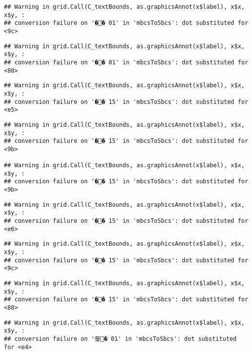 \documentclass[]{article}
\begin{document}
\begin{verbatim}
## Warning in grid.Call(C_textBounds, as.graphicsAnnot(x$label), x$x, x$y, :
## conversion failure on '�� 01' in 'mbcsToSbcs': dot substituted for <9c>
\end{verbatim}

\begin{verbatim}
## Warning in grid.Call(C_textBounds, as.graphicsAnnot(x$label), x$x, x$y, :
## conversion failure on '�� 01' in 'mbcsToSbcs': dot substituted for <88>
\end{verbatim}

\begin{verbatim}
## Warning in grid.Call(C_textBounds, as.graphicsAnnot(x$label), x$x, x$y, :
## conversion failure on '�� 15' in 'mbcsToSbcs': dot substituted for <e5>
\end{verbatim}

\begin{verbatim}
## Warning in grid.Call(C_textBounds, as.graphicsAnnot(x$label), x$x, x$y, :
## conversion failure on '�� 15' in 'mbcsToSbcs': dot substituted for <9b>

## Warning in grid.Call(C_textBounds, as.graphicsAnnot(x$label), x$x, x$y, :
## conversion failure on '�� 15' in 'mbcsToSbcs': dot substituted for <9b>
\end{verbatim}

\begin{verbatim}
## Warning in grid.Call(C_textBounds, as.graphicsAnnot(x$label), x$x, x$y, :
## conversion failure on '�� 15' in 'mbcsToSbcs': dot substituted for <e6>
\end{verbatim}

\begin{verbatim}
## Warning in grid.Call(C_textBounds, as.graphicsAnnot(x$label), x$x, x$y, :
## conversion failure on '�� 15' in 'mbcsToSbcs': dot substituted for <9c>
\end{verbatim}

\begin{verbatim}
## Warning in grid.Call(C_textBounds, as.graphicsAnnot(x$label), x$x, x$y, :
## conversion failure on '�� 15' in 'mbcsToSbcs': dot substituted for <88>
\end{verbatim}

\begin{verbatim}
## Warning in grid.Call(C_textBounds, as.graphicsAnnot(x$label), x$x, x$y, :
## conversion failure on '鈭� 01' in 'mbcsToSbcs': dot substituted for <e4>
\end{verbatim}
\end{document}
